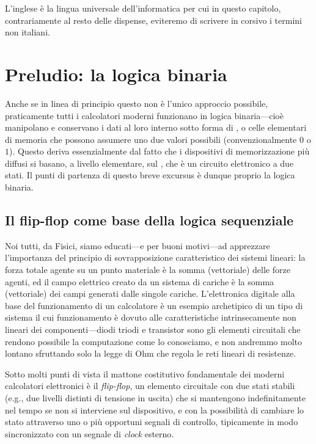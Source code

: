 L'inglese \`e la lingua universale dell'informatica per cui in questo capitolo,
contrariamente al resto delle dispense, eviteremo di scrivere in corsivo i termini
non italiani.


\section{Preludio: la logica binaria}

Anche se in linea di principio questo non è l'unico approccio possibile, praticamente
tutti i calcolatori moderni funzionano in logica binaria---cioè manipolano e conservano
i dati al loro interno sotto forma di , o celle elementari di memoria
che possono assumere uno due valori possibili (convenzionalmente $0$ o $1$). Questo
deriva essenzialmente dal fatto che i dispositivi di memorizzazione più diffusi si
basano, a livello elementare, sul , che è un circuito elettronico a due stati.
Il punti di partenza di questo breve excursus \`e dunque proprio la logica binaria.


\subsection{Il flip-flop come base della logica sequenziale}

Noi tutti, da Fisici, siamo educati---e per buoni motivi---ad apprezzare l'importanza
del principio di sovrapposizione caratteristico dei sistemi lineari: la forza totale
agente su un punto materiale \`e la somma (vettoriale) delle forze agenti, ed il
campo elettrico creato da un sistema di cariche \`e la somma (vettoriale) dei campi
generati dalle singole cariche. L'elettronica digitale alla base del funzionamento
di un calcolatore \`e un esempio archetipico di un tipo di sistema il cui funzionamento
\`e dovuto alle caratteristiche intrinsecamente non lineari dei componenti---diodi
triodi e transistor sono gli elementi circuitali che rendono possibile la computazione
come lo conosciamo, e non andremmo molto lontano sfruttando solo la legge di Ohm
che regola le reti lineari di resistenze.

Sotto molti punti di vista il mattone costitutivo fondamentale dei moderni calcolatori
elettronici \`e il \emph{flip-flop}, un elemento circuitale con due stati stabili
(e.g., due livelli distinti di tensione in uscita) che si mantengono indefinitamente
nel tempo se non si interviene sul dispositivo, e con la possibilit\`a di
cambiare lo stato attraverso uno o pi\`u opportuni segnali di controllo, tipicamente
in modo sincronizzato con un segnale di \emph{clock} esterno.

